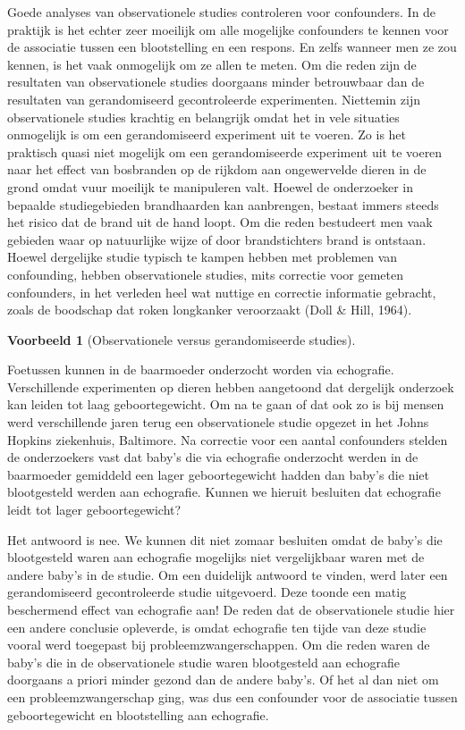 \documentclass[
  12pt,dutch]{book}
\theoremstyle{definition}
\theoremstyle{definition}
\newtheorem{example}{Voorbeeld}[chapter]
\theoremstyle{definition}
\theoremstyle{definition}
\theoremstyle{remark}
\begin{document}
Goede analyses van observationele studies controleren voor confounders. In
de praktijk is het echter zeer moeilijk om alle mogelijke confounders te
kennen voor de associatie tussen een blootstelling en een respons. En zelfs
wanneer men ze zou kennen, is het vaak onmogelijk om ze allen te meten. Om
die reden zijn de resultaten van observationele studies doorgaans minder
betrouwbaar dan de resultaten van gerandomiseerd gecontroleerde
experimenten. Niettemin zijn observationele studies krachtig en belangrijk
omdat het in vele situaties onmogelijk is om een gerandomiseerd experiment
uit te voeren. Zo is het praktisch quasi niet mogelijk om een
gerandomiseerde experiment uit te voeren naar het effect van bosbranden op de rijkdom aan ongewervelde dieren in de grond omdat vuur moeilijk te manipuleren valt. Hoewel de onderzoeker in bepaalde studiegebieden brandhaarden kan aanbrengen, bestaat immers steeds het risico dat de brand uit de hand loopt. Om die reden bestudeert men vaak gebieden waar op natuurlijke wijze of door brandstichters brand is ontstaan. Hoewel dergelijke studie typisch te kampen hebben met problemen van confounding, hebben observationele studies, mits correctie
voor gemeten confounders, in het verleden heel wat nuttige en correctie informatie gebracht, zoals de boodschap dat roken longkanker veroorzaakt (Doll \& Hill, 1964).

\begin{example}[Observationele versus gerandomiseerde studies]
\protect\hypertarget{exm:unnamed-chunk-84}{}\label{exm:unnamed-chunk-84}~
\end{example}

Foetussen kunnen in de baarmoeder onderzocht worden via
echografie. Verschillende experimenten op dieren hebben aangetoond dat
dergelijk onderzoek kan leiden tot laag geboortegewicht. Om na te gaan of
dat ook zo is bij mensen werd verschillende jaren terug een observationele
studie opgezet in het Johns Hopkins ziekenhuis, Baltimore. Na correctie voor
een aantal confounders stelden de onderzoekers vast dat baby's die via
echografie onderzocht werden in de baarmoeder gemiddeld een lager
geboortegewicht hadden dan baby's die niet blootgesteld werden aan
echografie. Kunnen we hieruit besluiten dat echografie leidt tot lager
geboortegewicht?

Het antwoord is nee. We kunnen dit niet zomaar besluiten omdat de baby's die blootgesteld waren aan echografie mogelijks niet vergelijkbaar waren met de andere baby's in de studie. Om een duidelijk antwoord te vinden, werd later een gerandomiseerd
gecontroleerde studie uitgevoerd. Deze toonde een matig beschermend effect
van echografie aan! De reden dat de observationele studie hier een andere
conclusie opleverde, is omdat echografie ten tijde van deze studie vooral
werd toegepast bij probleemzwangerschappen. Om die reden waren de baby's die
in de observationele studie waren blootgesteld aan echografie doorgaans a
priori minder gezond dan de andere baby's. Of het al dan niet om een
probleemzwangerschap ging, was dus een confounder voor de associatie tussen
geboortegewicht en blootstelling aan echografie.
\end{document}
